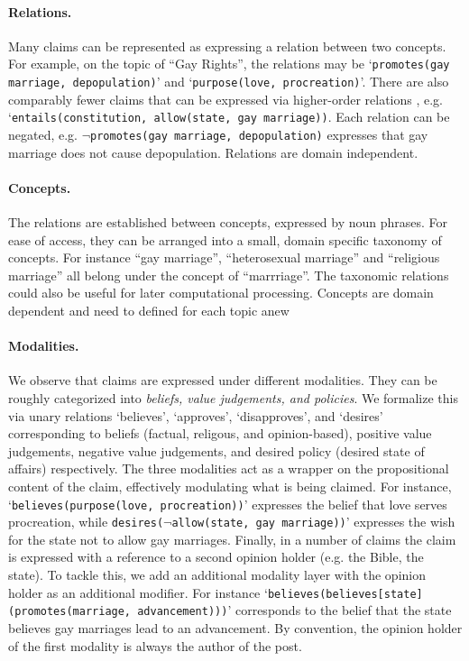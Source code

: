 \paragraph{Relations. }  Many claims can be represented as expressing a
relation between two concepts. For example, on the topic of ``Gay Rights'', 
the relations may be `\texttt{promotes(gay marriage, depopulation)}' and 
`\texttt{purpose(love, procreation)}'. 
There are also comparably fewer claims that can be expressed via
higher-order relations , e.g. `\texttt{entails(constitution, allow(state, gay marriage))}. 
Each relation can be negated, e.g. $\neg$\texttt{promotes(gay marriage,
depopulation)} expresses that gay marriage does not cause depopulation. 
Relations are domain independent. 

\paragraph{Concepts. }
The relations are established between concepts, expressed by noun phrases. 
For ease of access, they can be arranged into a small, domain specific taxonomy of concepts. 
For instance ``gay marriage'', ``heterosexual marriage'' and ``religious marriage''
all belong under the concept of ``marrriage''. 
The taxonomic relations could also be useful for later computational processing. 
Concepts are domain dependent and need to defined for each topic anew

\paragraph{Modalities. }
We observe that claims are expressed under different modalities. 
They can be roughly categorized into \textit{beliefs, value judgements, and policies}. 
We formalize this via unary relations `believes', `approves', `disapproves',
and `desires' corresponding 
to beliefs (factual, religous, and opinion-based), positive value judgements, negative value 
judgements, and desired policy (desired state of affairs) respectively. 
The three modalities act as a wrapper on the propositional content of the claim, 
effectively modulating what is being claimed. 
For instance, `\texttt{believes(purpose(love, procreation))}' expresses the belief 
that love serves procreation, while \texttt{desires(}$\neg$\texttt{allow(state, gay marriage))}'
expresses the wish for the state not to allow gay marriages. 
Finally, in a number of claims the claim is expressed with a reference to a second
opinion holder (e.g. the Bible, the state). 
To tackle this, we add an additional modality layer with the opinion holder as
an additional modifier. 
For instance `\texttt{believes(believes[state](promotes(marriage, advancement)))}' corresponds
to the belief that the state believes gay marriages lead to an advancement. 
By convention, the opinion holder of the first modality is always the author of the post. 

